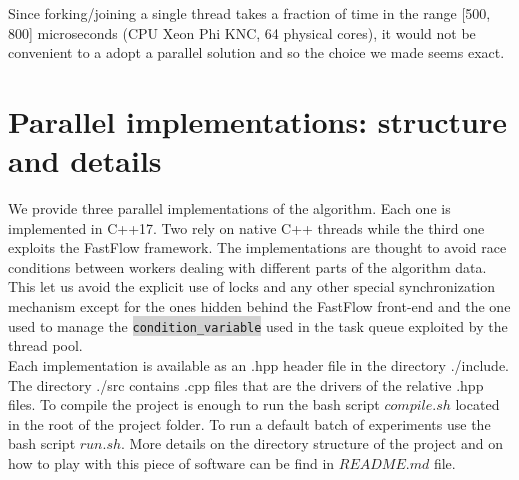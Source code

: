 \documentclass[11pt]{article}
\newcommand{\inlinecode}[2]{\colorbox{lightgray}{\lstinline[language=#1]$#2$}}
\begin{document}
Since forking/joining a single thread takes a fraction of time in the range [500, 800] microseconds (CPU Xeon Phi KNC, 64 physical cores), it would not be convenient to a adopt a parallel solution and so the choice we made seems exact.



\section{Parallel implementations: structure and details}
We provide three parallel implementations of the algorithm. Each one is implemented in C++17. Two rely on native C++ threads while the third one exploits the FastFlow framework. The implementations are thought to avoid race conditions between workers dealing with different parts of the algorithm data. This let us avoid the explicit use of locks and any other special synchronization mechanism except for the ones hidden behind the FastFlow front-end and the one used to manage the \inlinecode{C++}{condition_variable} used in the task queue exploited by the thread pool.\\
Each implementation is available as an .hpp header file in the directory ./include.
The directory ./src contains .cpp files that are the drivers of the relative .hpp files.
To compile the project is enough to run the bash script $ compile.sh $ located in the root of the project folder. To run a default batch of experiments use the bash script $ run.sh $. More details on the directory structure of the project and on how to play with this piece of software can be find in $ README.md $ file.
\end{document}
